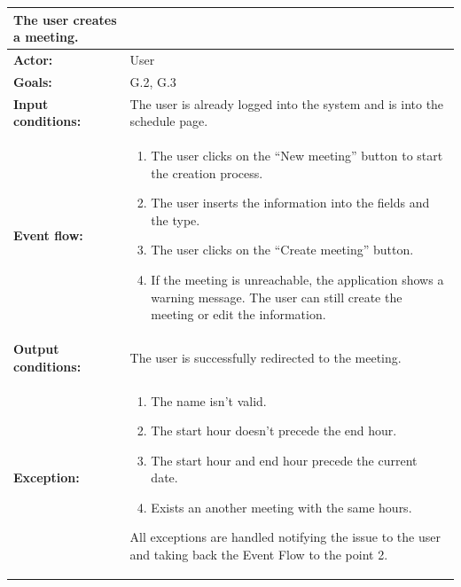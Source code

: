 \begin{tabular} { p{5cm} p{8cm} }  
\textbf{The user creates a meeting.}\\
\hline
\textbf{Actor:} & User \\ 
\textbf{Goals:} & G.2, G.3 \\ 
\textbf{Input conditions:} & The user is already logged into the system and is into the schedule page. \\
\textbf{Event flow:} & \begin{enumerate}
				\item
				The user clicks on the “New meeting” button to start the creation process.
				\item
				The user inserts the information  into the fields and the type.
				\item
				The user clicks on the “Create meeting” button.
				\item
				If the meeting is unreachable, the application shows a warning message. The user can still create the meeting or edit the information.
			\end{enumerate}\\ 
\textbf{Output conditions:} & The user is successfully redirected to the
meeting.\\ 
\textbf{Exception:} & \begin{enumerate}
				\item
				The name isn’t valid.
				\item
				The start hour doesn’t precede the end hour.
				\item
				The start hour and end hour precede the current date.
				\item
				Exists an another meeting with the same hours. 
			\end{enumerate}
All exceptions are handled notifying the issue to the user and taking back the Event Flow to the point 2.
\\
\hline
\end{tabular}


